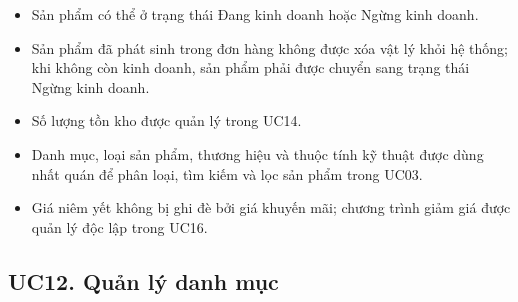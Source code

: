 \documentclass[12pt,a4paper]{article}
\begin{document}
\begin{itemize}
\begin{itemize}
  \item Sản phẩm có thể ở trạng thái Đang kinh doanh hoặc Ngừng kinh doanh.

  \item Sản phẩm đã phát sinh trong đơn hàng không được xóa vật lý khỏi hệ thống; khi không còn kinh doanh, sản phẩm phải được chuyển sang trạng thái Ngừng kinh doanh.

  \item Số lượng tồn kho được quản lý trong UC14.

   \item Danh mục, loại sản phẩm, thương hiệu và thuộc tính kỹ thuật được dùng nhất quán để phân loại, tìm kiếm và lọc sản phẩm trong UC03.

   \item Giá niêm yết không bị ghi đè bởi giá khuyến mãi; chương trình giảm giá được quản lý độc lập trong UC16.

 \end{itemize}

\end{itemize}


\subsection{UC12. Quản lý danh mục}
\end{document}
